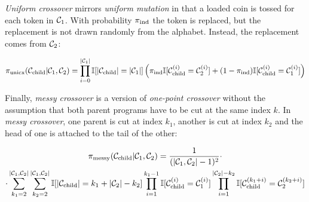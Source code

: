 \emph{Uniform crossover} mirrors \emph{uniform mutation} in that a loaded coin is tossed for each token in $\mathcal{C}_1$. With probability $\pi_\text{ind}$ the token is replaced, but the replacement is not drawn randomly from the alphabet. Instead, the replacement comes from $\mathcal{C}_2$:

\begin{equation}
    \pi_\text{unicx}(\mathcal{C}_\text{child}|\mathcal{C}_1,\mathcal{C}_2) = \prod\limits_{i=0}^{|\mathcal{C}_1|} \mathbb{I} [|\mathcal{C}_\text{child}|=|\mathcal{C}_1|] \\ \left(\pi_\text{ind} \mathbb{I} [\mathcal{C}_\text{child}^{(i)} = \mathcal{C}_2^{(i)}] + (1 - \pi_\text{ind}) \mathbb{I} [\mathcal{C}_\text{child}^{(i)} = \mathcal{C}_1^{(i)}] \right)
\end{equation}

Finally, \emph{messy crossover} is a version of \emph{one-point crossover} without the assumption that both parent programs have to be cut at the same index $k$.
In \emph{messy crossover}, one parent is cut at index $k_1$, another is cut at index $k_2$ and the head of one is attached to the tail of the other:

\begin{multline}
    \pi_\text{messy}(\mathcal{C}_\text{child}|\mathcal{C}_1,\mathcal{C}_2) = \frac{1}{(|\mathcal{C}_1,\mathcal{C}_2|-1)^2} \cdot \\ \cdot \sum\limits_{k_1=2}^{|\mathcal{C}_1,\mathcal{C}_2|} \sum\limits_{k_2=2}^{|\mathcal{C}_1,\mathcal{C}_2|} \mathbb{I} [|\mathcal{C}_\text{child}|=k_1+|\mathcal{C}_2|-k_2] \prod\limits_{i=1}^{k_1-1} \mathbb{I} [\mathcal{C}_\text{child}^{(i)} = \mathcal{C}_1^{(i)}] \prod\limits_{i=1}^{|\mathcal{C}_2|-k_2} \mathbb{I} [\mathcal{C}_\text{child}^{(k_1+i)} = \mathcal{C}_2^{(k_2+i)}]
\end{multline}

